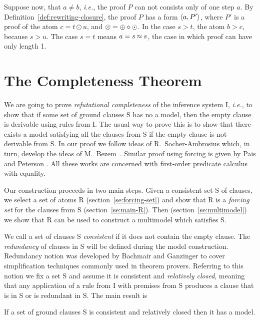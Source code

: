 \begin{PROOF}
Suppose now, that \(a\ne b\), {\em i.e.}, the proof \(P\) can not consists
only of one step \(a\). By Definition~\ref {def:rewriting-closure}, the proof
$P$ has a form \(\langle a,P'\rangle\), where $P'$ is a proof of the atom \(c=t\odot u\),
and \(\otimes = \oplus\diamond\odot\). In the case \(s>t\), the atom \(b>c\),
because \(s>u\). The case \(s=t\) means \(a=s\mathbin{\approx} s\), the case in which proof
can have only length 1. 
\end{PROOF}

\section{The Completeness Theorem} \label{se:completeness}

We are going to prove {\em refutational completeness} of the inference system
\C I, {\em i.e.}, to show that if some set of ground clauses \C S 
has no a model, then the empty clause is derivable using rules from \C I. The
usual way to prove this is to show that there exists a model satisfying all the
clauses from \C S if the empty clause is not derivable from \C S. In our proof
we follow ideas of R.~Socher-Ambrosius \cite{S-A} which, in
 turn, develop the ideas of M.~Bezem~\cite{Bez}. Similar
proof using forcing is given by Pais and Peterson \cite{PP}. All these
 works are concerned with first-order predicate calculus with equality.

Our construction proceeds in two main steps. Given a consistent set \C S
of clauses, we select a set of atoms \C R (section~\ref{se:forcing-set}) 
and show that \C R is a {\em forcing set}\/ for  the clauses from \C S
(section~\ref{se:main-R}). Then (section~\ref{se:multimodel}) we show that
\C R can be used to construct a multimodel which satisfies \C S.

We call a set of clauses \C S {\em consistent} if it does not contain the
empty clause.  The {\em redundancy} of clauses in \C S will be defined during
the model construction. Redundancy notion was developed by Bachmair and
Ganzinger \cite{BG} to cover simplification techniques commonly used in
theorem provers.  Referring to this notion we fix a set \C S and assume it is
consistent and {\em relatively closed}, meaning that any application of a
rule from \C I with premises from \C S produces a clause that is in \C S or is
redundant in \C S. The main result is

\begin{THEOREM} \label{th:ground-completeness}
If a set of ground clauses \C S is consistent and relatively closed then it
has a model.
\end{THEOREM}

